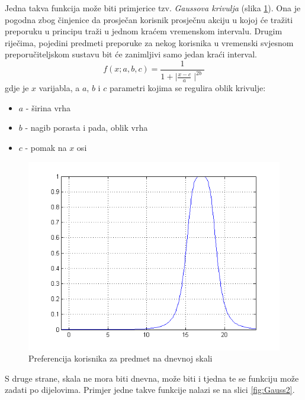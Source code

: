 \documentclass[times, utf8, diplomski, numeric]{fer}
\begin{document}
Jedna takva funkcija može biti primjerice tzv. \emph{Gaussova krivulja}
(slika \ref{fig:Gauss1}). Ona je pogodna zbog činjenice da prosječan korisnik
prosječnu akciju u kojoj će tražiti preporuku u principu traži u jednom kraćem
vremenskom intervalu. Drugim riječima, pojedini predmeti preporuke za nekog
korisnika u vremenski svjesnom preporučiteljskom sustavu bit će zanimljivi samo
jedan kraći interval.
\begin{equation}
	\label{eq:BellFunc}
	f(x;a,b,c) = \frac
	{
		1
	}
	{
		1 + \mid\frac{x - c}{a}\mid^{2b}
	}
\end{equation}
gdje je $x$ varijabla, a $a$, $b$ i $c$ parametri kojima se regulira oblik
krivulje:
\begin{itemize}
  \item $a$ - širina vrha
  \item $b$ - nagib porasta i pada, oblik vrha
  \item $c$ - pomak na $x$ osi
\end{itemize}

\begin{figure}[H]
	\centering
	\includegraphics[width=12cm]{images/zvonolika1matlab.png}
	\caption{Preferencija korisnika za predmet na dnevnoj skali}
	\label{fig:Gauss1}
\end{figure}

S druge strane, skala ne mora biti dnevna, može biti i tjedna te se funkciju
može zadati po dijelovima. Primjer jedne takve funkcije nalazi se na slici
\ref{fig:Gauss2}.
\end{document}
